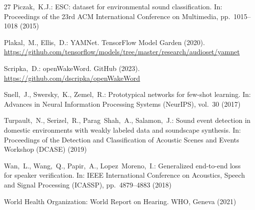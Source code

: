 \documentclass{svproc}
\begin{document}
\begin{thebibliography}{27}
Piczak,~K.J.: ESC: dataset for environmental sound classification. In: Proceedings of the 23rd ACM International Conference on Multimedia, pp.~1015--1018 (2015)

Plakal,~M., Ellis,~D.: YAMNet. TensorFlow Model Garden (2020). \url{https://github.com/tensorflow/models/tree/master/research/audioset/yamnet}

Scripka,~D.: openWakeWord. GitHub (2023). \url{https://github.com/dscripka/openWakeWord}

Snell,~J., Swersky,~K., Zemel,~R.: Prototypical networks for few-shot learning. In: Advances in Neural Information Processing Systems (NeurIPS), vol.~30 (2017)

Turpault,~N., Serizel,~R., Parag~Shah,~A., Salamon,~J.: Sound event detection in domestic environments with weakly labeled data and soundscape synthesis. In: Proceedings of the Detection and Classification of Acoustic Scenes and Events Workshop (DCASE) (2019)

Wan,~L., Wang,~Q., Papir,~A., Lopez~Moreno,~I.: Generalized end-to-end loss for speaker verification. In: IEEE International Conference on Acoustics, Speech and Signal Processing (ICASSP), pp.~4879--4883 (2018)

World Health Organization: World Report on Hearing. WHO, Geneva (2021)

\end{thebibliography}
\end{document}
